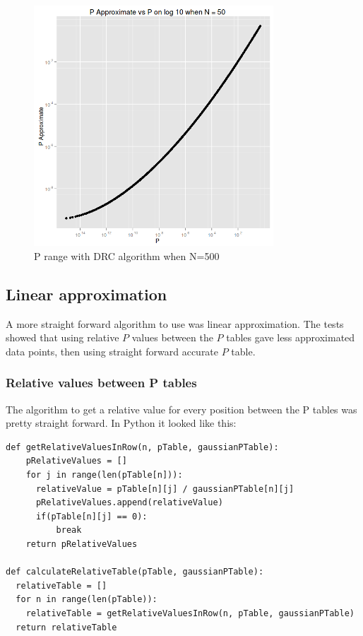 \documentclass[12pt]{article}
\begin{document}
\begin{figure}
  \centering
  \includegraphics[width=0.8\textwidth]{PvsP50}
  \caption{P range with DRC algorithm when N=500}
  \label{fig:PdivPapproxDrcWhenN500}
\end{figure}

\subsection{Linear approximation}

A more straight forward algorithm to use was linear approximation. The tests showed that using relative $P$ values between the $P$ tables gave less approximated data points, then using straight forward accurate $P$ table.

\subsubsection{Relative values between P tables}

The algorithm to get a relative value for every position between the P tables was pretty straight forward. In Python it looked like this:

\begin{verbatim}
def getRelativeValuesInRow(n, pTable, gaussianPTable):
    pRelativeValues = []
    for j in range(len(pTable[n])):
      relativeValue = pTable[n][j] / gaussianPTable[n][j]
      pRelativeValues.append(relativeValue)
      if(pTable[n][j] == 0):
          break
    return pRelativeValues

def calculateRelativeTable(pTable, gaussianPTable):
  relativeTable = []
  for n in range(len(pTable)):
    relativeTable = getRelativeValuesInRow(n, pTable, gaussianPTable)
  return relativeTable

\end{verbatim}
\end{document}
